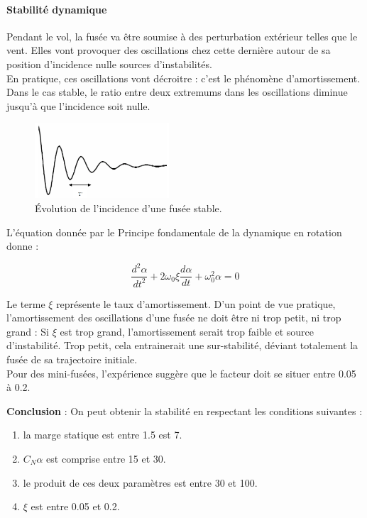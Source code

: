 \documentclass[a4paper]{article}
\begin{document}
\paragraph{Stabilité dynamique}

Pendant le vol, la fusée va être soumise à des perturbation extérieur telles que le vent. Elles vont provoquer des oscillations chez cette dernière autour de sa position d'incidence nulle sources d'instabilités.\\

En pratique, ces oscillations vont décroitre : c'est le phénomène d'amortissement. Dans le cas stable, le ratio entre deux extremums dans les oscillations diminue jusqu'à que l'incidence soit nulle.

\begin{figure}[!htbp]
\begin{center}
\includegraphics[width=5cm]{pictures/ammortissement.PNG} 
\end{center}
\caption{Évolution de l'incidence d'une fusée stable.}
\end{figure}

L'équation donnée par le Principe fondamentale de la dynamique en rotation donne : 

\begin{equation}
\frac{d^{2} \alpha}{dt^{2}} + 2\omega_{0} \xi  \frac{d \alpha}{dt} + \omega_{0}^{2}\alpha = 0
\end{equation}

Le terme $\xi$ représente le taux d'amortissement. D'un point de vue pratique, l'amortissement des oscillations d'une fusée ne doit être ni trop petit, ni trop grand : Si $\xi$ est trop grand, l'amortissement serait trop faible et source d'instabilité. Trop petit, cela entrainerait une sur-stabilité, déviant totalement la fusée de sa trajectoire initiale.\\

Pour des mini-fusées, l'expérience suggère que le facteur doit se situer entre 0.05 à 0.2.

\textbf{Conclusion} : On peut obtenir la stabilité en respectant les conditions suivantes :

\begin{enumerate}
\item la marge statique est entre 1.5 est 7.
\item  \textbf{$C_{N}\alpha$} est comprise entre 15 et 30.
\item le produit de ces deux paramètres est entre 30 et 100.
\item $\xi$ est entre 0.05 et 0.2.
\end{enumerate}
\end{document}
